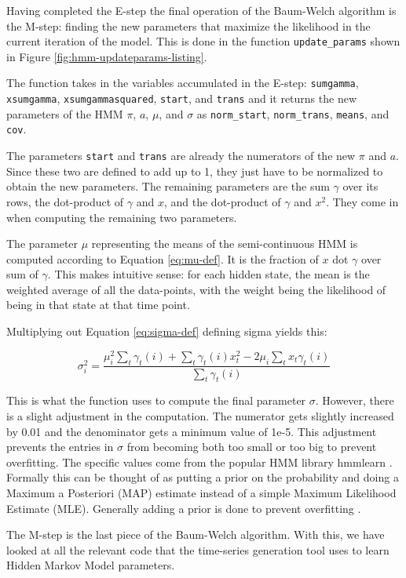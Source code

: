 Having completed the E-step the final operation of the Baum-Welch algorithm is the M-step: finding the new parameters that maximize the likelihood in the current iteration of the model. This is done in the function \texttt{update\_params} shown in Figure \ref{fig:hmm-updateparams-listing}.

The function takes in the variables accumulated in the E-step: \texttt{sumgamma}, \texttt{xsumgamma}, \texttt{xsumgammasquared}, \texttt{start}, and \texttt{trans} and it returns the new parameters of the HMM $\pi$, $a$, $\mu$, and $\sigma$ as \texttt{norm\_start}, \texttt{norm\_trans}, \texttt{means}, and \texttt{cov}. 

The parameters \texttt{start} and \texttt{trans} are already the numerators of the new $\pi$ and $a$. Since these two are defined to add up to 1, they just have to be normalized to obtain the new parameters. The remaining parameters are the sum $\gamma$ over its rows, the dot-product of $\gamma$ and $x$, and the dot-product of $\gamma$ and $x^2$. They come in when computing the remaining two parameters. 

The parameter $\mu$ representing the means of the semi-continuous HMM is computed according to Equation \eqref{eq:mu-def}. It is the fraction of $x$ dot $\gamma$ over sum of $\gamma$. This makes intuitive sense: for each hidden state, the mean is the weighted average of all the data-points, with the weight being the likelihood of being in that state at that time point. 

Multiplying out Equation \eqref{eq:sigma-def} defining sigma yields this: 

\begin{equation}
   \sigma_i^2 = \frac{\mu_i^2 \sum_t \gamma_t(i) + \sum_t \gamma_t(i)x_t^2 - 2 \mu_i \sum_t x_t \gamma_t(i)}{\sum_t \gamma_t(i)}
\end{equation}

This is what the function uses to compute the final parameter $\sigma$. However, there is a slight adjustment in the computation. The numerator gets slightly increased by 0.01 and the denominator gets a minimum value of 1e-5. This adjustment prevents the entries in $\sigma$ from becoming both too small or too big to prevent overfitting. The specific values come from the popular HMM library hmmlearn \parencite{weiss2019hmmlearn}. Formally this can be thought of as putting a prior on the probability and doing a Maximum a Posteriori (MAP) estimate instead of a simple Maximum Likelihood Estimate (MLE). Generally adding a prior is done to prevent overfitting \parencite{gauvain1994maximum}.

The M-step is the last piece of the Baum-Welch algorithm. With this, we have looked at all the relevant code that the time-series generation tool uses to learn Hidden Markov Model parameters. 